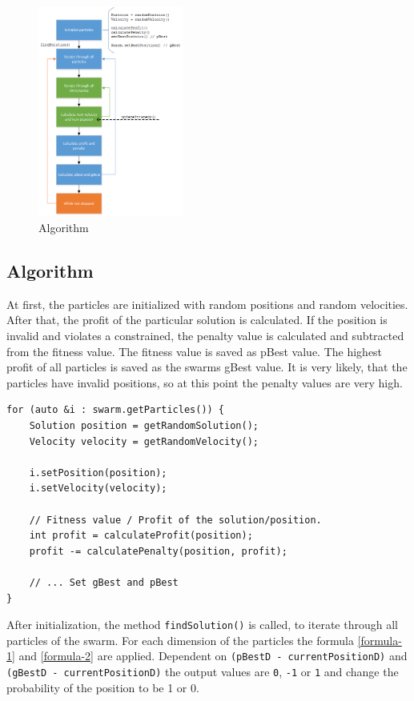 \documentclass{article}
\begin{document}
\begin{figure}[H]
    \centering
    \includegraphics[width=180px]{images/algo.png}
    \caption{Algorithm}
    \label{fig-algo}
\end{figure}

\subsection{Algorithm}
At first, the particles are initialized with random positions and random velocities. After that, the profit of the particular solution is calculated. If the position is invalid and violates a constrained, the penalty value is calculated and subtracted from the fitness value. The fitness value is saved as pBest value. The highest profit of all particles is saved as the swarms gBest value. It is very likely, that the particles have invalid positions, so at this point the penalty values are very high.

\begin{lstlisting}[caption="Solver.cpp"]
for (auto &i : swarm.getParticles()) {
	Solution position = getRandomSolution();
   	Velocity velocity = getRandomVelocity();

	i.setPosition(position);
	i.setVelocity(velocity);
	
	// Fitness value / Profit of the solution/position.
	int profit = calculateProfit(position);
	profit -= calculatePenalty(position, profit);
	
	// ... Set gBest and pBest
}
\end{lstlisting}

After initialization, the method \lstinline$findSolution()$ is called, to iterate through all particles of the swarm. For each dimension of the particles the formula \ref{formula-1} and \ref{formula-2} are applied. Dependent on \lstinline{(pBestD - currentPositionD)} and \lstinline{(gBestD - currentPositionD)} the output values are \lstinline$0$, \lstinline$-1$ or \lstinline$1$ and change the probability of the position to be 1 or 0.
\end{document}
